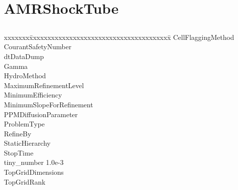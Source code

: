 \documentclass{book}
\begin{document}
\subsection{\cello}

\section{AMRShockTube} \label{s:AMRShockTube}

\subsection{\enzo}

{\parametersize
\begin{tabbing}
xxxxxxx\=xxxxxxxxxxxxxxxxxxxxxxxxxxxxxxxxxxxxxxx\=\kill
\> CellFlaggingMethod         \\
\> CourantSafetyNumber     \\
\> dtDataDump              \\
\> Gamma                   \\
\> HydroMethod             \\
\> MaximumRefinementLevel         \\
\> MinimumEfficiency            \\
\> MinimumSlopeForRefinement    \\
\> PPMDiffusionParameter          \\
\> ProblemType                    \\
\> RefineBy                       \\
\> StaticHierarchy                \\
\> StopTime                \\
\> tiny\_number            \> 1.0e-3   \\
\> TopGridDimensions       \\
\> TopGridRank            
\end{tabbing}}

\subsection{\cello}
\end{document}
